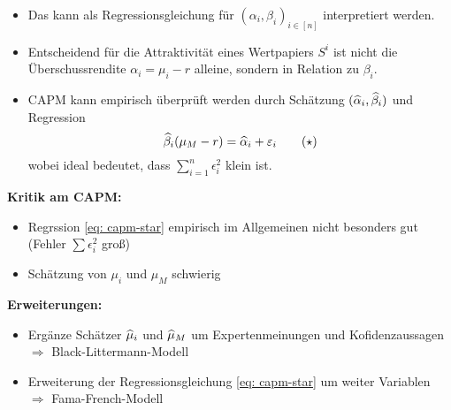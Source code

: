 \begin{itemize}
	\begin{itemize}[nolistsep]
		\item Das kann als Regressionsgleichung für $(\alpha_i, \beta_i)_{i \in [n]}$ interpretiert werden.
		\item  Entscheidend für die Attraktivität eines Wertpapiers $S^i$ ist nicht die Überschussrendite $\alpha_i = \mu_i - r$ alleine, sondern in Relation zu $\beta_i$.
		\item CAPM kann empirisch überprüft werden durch Schätzung $(\widehat{\alpha}_i, \widehat{\beta}_i)$ und Regression
		\begin{equation*}
			\widehat{\beta}_i (\mu_M - r) = \widehat{\alpha}_i + \varepsilon_i
			\tag{$\star$} \label{eq: capm-star}
		\end{equation*}
		wobei ideal bedeutet, dass $\sum_{i=1}^n \epsilon_i^2$ klein ist.
	\end{itemize}
\end{itemize}

\textbf{Kritik am CAPM:}
\begin{itemize}[nolistsep, topsep=-\parskip]
	\item Regrssion \eqref{eq: capm-star} empirisch im Allgemeinen nicht besonders gut (Fehler $\sum \epsilon_i^2$ groß)
	\item Schätzung von $\mu_i$ und $\mu_M$ schwierig
\end{itemize}

\vspace{\parskip}

\textbf{Erweiterungen:}
\begin{itemize}[nolistsep, topsep=-\parskip]
	\item Ergänze Schätzer $\widehat{\mu}_i$ und $\widehat{\mu}_M$ um Expertenmeinungen und Kofidenzaussagen \\
	$\Rightarrow$ Black-Littermann-Modell
	\item Erweiterung der Regressionsgleichung \eqref{eq: capm-star} um weiter Variablen \\
	$\Rightarrow$ Fama-French-Modell
\end{itemize}